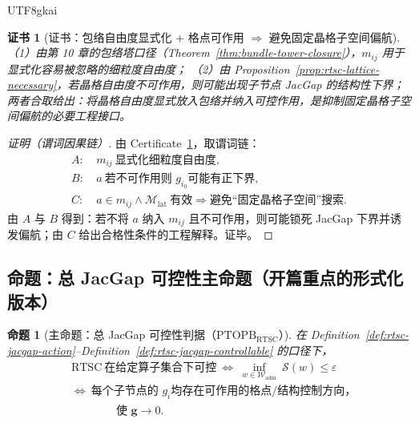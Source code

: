 \documentclass[12pt]{article}
\newtheorem{proposition}{命题}[section]
\newtheorem{certificate}{证书}[section]
\newcommand{\PTOPB}{\ensuremath{\mathrm{PTOPB}}}
\begin{document}
\begin{CJK*}{UTF8}{gkai}
\begin{certificate}[证书：包络自由度显式化 + 格点可作用 $\Rightarrow$ 避免固定晶格子空间偏航]
\label{cert:rtsc-envelope-lattice-qualified}
（1）由第 10 章的包络塔口径（Theorem~\ref{thm:bundle-tower-closure}），$m_{ij}$ 用于显式化容易被忽略的细粒度自由度；
（2）由 Proposition~\ref{prop:rtsc-lattice-necessary}，若晶格自由度不可作用，则可能出现子节点 JacGap 的结构性下界；
两者合取给出：将晶格自由度显式放入包络并纳入可控作用，是抑制固定晶格子空间偏航的必要工程接口。
\end{certificate}

\begin{proof}[证明（谓词因果链）]
由 Certificate~\ref{cert:rtsc-envelope-lattice-qualified}，取谓词链：
\[
\begin{aligned}
A:&\ m_{ij}\ \text{显式化细粒度自由度},\\
B:&\ a\ \text{若不可作用则 }g_{i_0}\text{可能有正下界},\\
C:&\ a\in m_{ij}\wedge \mathcal{M}_{\mathrm{lat}}\ \text{有效}\Rightarrow \text{避免“固定晶格子空间”搜索}.
\end{aligned}
\]
由 $A$ 与 $B$ 得到：若不将 $a$ 纳入 $m_{ij}$ 且不可作用，则可能锁死 JacGap 下界并诱发偏航；由 $C$ 给出合格性条件的工程解释。证毕。
\end{proof}

\subsection{命题：总 JacGap 可控性主命题（开篇重点的形式化版本）}

\begin{proposition}[主命题：总 JacGap 可控性判据（\PTOPB$_{\mathrm{RTSC}}$）]
\label{prop:rtsc-jacgap-controllability-main}
在 Definition~\ref{def:rtsc-jacgap-action}--Definition~\ref{def:rtsc-jacgap-controllable} 的口径下，
\[
\boxed{
\begin{aligned}
&\mathrm{RTSC}\ \text{在给定算子集合下可控}
\ \Longleftrightarrow\
\inf_{w\in\mathcal{W}_{\mathrm{adm}}}\ \mathcal{S}(w)\le \varepsilon
\\
&\Longleftrightarrow\
\text{每个子节点的 }g_i\text{均存在可作用的格点/结构控制方向，}
\\
&\hspace{4em}\text{使 }\mathbf{g}\to 0.
\end{aligned}
}
\]
\end{proposition}


\end{CJK*}
\end{document}
